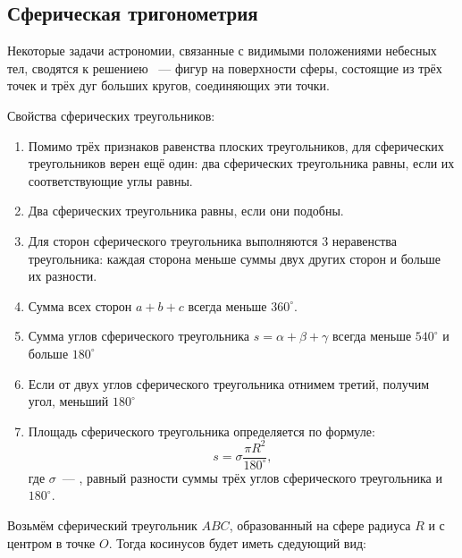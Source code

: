 \subsection{Сферическая тригонометрия}
Некоторые задачи астрономии, связанные с видимыми положениями небесных тел, сводятся к решениею ~--- фигур на поверхности сферы, состоящие из трёх точек и трёх дуг больших кругов, соединяющих эти точки.

Свойства сферических треугольников:
\begin{enumerate}
\item Помимо трёх признаков равенства плоских треугольников, для сферических треугольников верен ещё один: два сферических треугольника равны, если их соответствующие углы равны.
\item Два сферических треугольника равны, если они подобны.
\item Для сторон сферического треугольника выполняются 3 неравенства треугольника: каждая сторона меньше суммы двух других сторон и больше их разности.
\item Сумма всех сторон $a+b+c$ всегда меньше $360^{\circ}$.
\item Сумма углов сферического треугольника $s=\alpha +\beta +\gamma$ всегда меньше $540^{\circ}$  и больше $180^{\circ}$
\item Если от двух углов сферического треугольника отнимем третий, получим угол, меньший $180^{\circ}$
\item Площадь сферического треугольника определяется по формуле:
\begin{equation}
s=\sigma\frac{\pi R^2}{180^{\circ}},
\end{equation}
где $\sigma$~--- , равный разности суммы трёх углов сферического треугольника и $180^{\circ}$.
\end{enumerate}

Возьмём сферический треугольник $ABC$, образованный на сфере радиуса $R$ и с центром в точке $O$. Тогда  косинусов будет иметь сдедующий вид:

